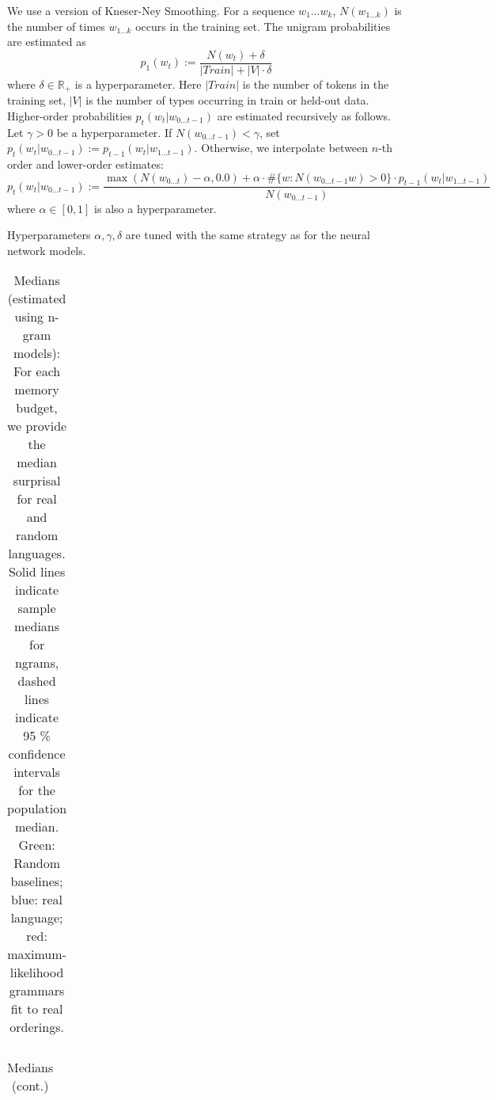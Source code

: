 
%

We use a version of Kneser-Ney Smoothing.
For a sequence $w_1\dots w_k$, $N(w_{1\dots k})$ is the number of times $w_{1\dots k}$ occurs in the training set.
The unigram probabilities are estimated as
\begin{equation}
	p_1(w_t) :=   \frac{N(w_t) + \delta}{|Train| + |V| \cdot \delta}
\end{equation}
where $\delta \in \mathbb{R}_+$ is a hyperparameter.
Here $|Train|$ is the number of tokens in the training set, $|V|$ is the number of types occurring in train or held-out data.
Higher-order probabilities $p_t(w_t|w_{0 \dots t-1})$ are estimated recursively as follows.
Let $\gamma > 0$ be a hyperparameter.
If $N(w_{0 \dots t-1}) < \gamma$, set $p_t(w_t|w_{0 \dots t-1}) := p_{t-1}(w_t|w_{1\dots t-1})$.
Otherwise, we interpolate between $n$-th order and lower-order estimates:
\begin{equation}
	p_t(w_t|w_{0 \dots t-1}) :=  \frac{\operatorname{max}(N(w_{0\dots t}) - \alpha, 0.0) + \alpha \cdot \#\{w : N(w_{0 \dots t-1}w) > 0\} \cdot p_{t-1}(w_t|w_{1\dots t-1})}{N(w_{0\dots t-1})}
\end{equation}
where $\alpha \in [0,1]$ is also a hyperparameter.

Hyperparameters $\alpha, \gamma, \delta$ are tuned with the same strategy as for the neural network models.



\begin{table}
\begin{tabular}{ccccccccccccccclll}

\end{tabular}
	\caption{Medians (estimated using n-gram models): For each memory budget, we provide the median surprisal for real and random languages. Solid lines indicate sample medians for ngrams, dashed lines indicate 95 \% confidence intervals for the population median. Green: Random baselines; blue: real language; red: maximum-likelihood grammars fit to real orderings.}\label{tab:medians_ngrams}
\end{table}

\begin{table}
\begin{tabular}{ccccccccccccccclll}

\end{tabular}
	\caption{Medians (cont.)}
\end{table}


